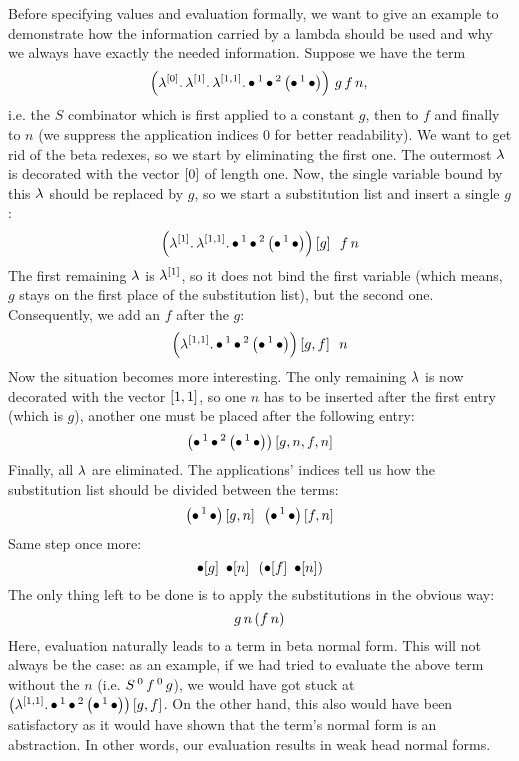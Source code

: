\documentclass[submission,copyright,creativecommons]{eptcs}
\begin{document}
Before specifying values and evaluation formally, we want to give an example to demonstrate how the information carried by a lambda should be used and why we always have exactly the needed information. Suppose we have the term
\[
\left(\lambda ^{[0]} . \, \lambda ^{[1]} . \, \lambda ^{[1,1]} . \, \mathord{\bullet} \, ^{1} \, \mathord{\bullet} \, ^{2} \, {\left( \mathord{\bullet} \, ^{1} \, \mathord{\bullet} \right)}\right) \, g \, f \, n, \\ 
\]
i.e. the $S$ combinator which is first applied to a constant $g$, then to $f$ and finally to $n$ (we suppress the application indices $0$ for better readability). We want to get rid of the beta redexes, so we start by eliminating the first one. The outermost $\lambda$ is decorated with the vector $[0]$ of length one. Now, the single variable bound by this $\lambda$ should be replaced by $g$, so we start a substitution list and insert a single $g$:
\[
\left(\lambda ^{[1]} . \, \lambda ^{[1,1]} . \, \mathord{\bullet} \, ^{1} \, \mathord{\bullet} \, ^{2} \, {\left( \mathord{\bullet} \, ^{1} \, \mathord{\bullet} \right)}\right) \left[ g \right] \ \, f \, n
\]
The first remaining $\lambda$ is $\lambda^{[1]}$, so it does not bind the first variable (which means, $g$ stays on the first place of the substitution list), but the second one. Consequently, we add an $f$ after the $g$:
\[
\left(\lambda ^{[1,1]} . \, \mathord{\bullet} \, ^{1} \, \mathord{\bullet} \, ^{2} \, {\left( \mathord{\bullet} \, ^{1} \, \mathord{\bullet} \right)}\right)  \left[ g, f \right] \ \, n
\]
Now the situation becomes more interesting. The only remaining $\lambda$ is now decorated with the vector $[1,1]$, so one $n$ has to be inserted after the first entry (which is $g$), another one must be placed after the following entry:
\[
\left(\mathord{\bullet} \, ^{1} \, \mathord{\bullet} \, ^{2} \, {\left( \mathord{\bullet} \, ^{1} \, \mathord{\bullet} \right)}\right)  \left[ g, n, f, n \right]
\]
Finally, all $\lambda$ are eliminated. The applications' indices tell us how the substitution list should be divided between the terms:
\[
\left(\mathord{\bullet} \, ^{1} \, \mathord{\bullet}\right)\left[ g, n \right] \ \, \left(\mathord{\bullet} \, ^{1} \, \mathord{\bullet}\right) \left[ f, n \right]
\]
Same step once more:
\[
\mathord{\bullet}[g]  \ \, \mathord{\bullet}[n]  \ \, \left(\mathord{\bullet}[f]  \ \, \mathord{\bullet}[n]\right)
\]
The only thing left to be done is to apply the substitutions in the obvious way:
\[
g \, n  \, (f \, n)
\]
Here, evaluation naturally leads to a term in beta normal form. This will not always be the case: as an example, if we had tried to evaluate the above term without the $n$ (i.e. $S \, ^{0} \, f \, ^{0} \, g$), we would have got stuck at $\left(\lambda ^{[1,1]} . \, \mathord{\bullet} \, ^{1} \, \mathord{\bullet} \, ^{2} \, {\left( \mathord{\bullet} \, ^{1} \, \mathord{\bullet} \right)}\right)  \left[ g, f \right]$. On the other hand, this also would have been satisfactory as it would have shown that the term's normal form is an abstraction. In other words, our evaluation results in weak head normal forms. %
\end{document}
